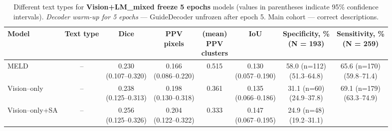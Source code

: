 \documentclass[FCD_GNN.tex]{subfiles}
\begin{document}
\begin{table}[H]
\centering
\tiny
\caption{Different text types for \textbf{Vision+LM\_mixed freeze 5 epochs} models (values in parentheses indicate 95\% confidence intervals). \emph{Decoder warm-up for 5 epochs} — GuideDecoder unfrozen after epoch 5. Main cohort — correct descriptions.}

\label{tab:main_cohort_mixed_5_epochs_correct}
\begin{tabular}{lccccccc}
\textbf{Model} &
\textbf{Text type} &
\textbf{Dice} &
\makecell{\textbf{PPV}\\\textbf{pixels}} &
\makecell{\textbf{(mean)} \\\textbf{PPV} \\\textbf{clusters}} & 
\textbf{IoU} & 
\makecell{\textbf{Specificity, \%} \\ (N = 193)}&
\makecell{\textbf{Sensitivity, \%} \\ (N = 259)}\\
\hline
MELD & -- &
\makecell{\colorbox{orange!15}{0.230}\\(0.107--0.320)} &
\makecell{0.166\\(0.086--0.220)} &
\colorbox{green!15}{0.515} &
\makecell{\colorbox{orange!15}{0.130}\\(0.057--0.190)} &
\makecell{58.0 (n=112) \\ (51.3--64.8)}&
\makecell{65.6 (n=170) \\ (59.8--71.4)} \\
\hline
Vision--only & -- &
\makecell{\colorbox{cyan!15}{0.238}\\(0.125--0.313)} &
\makecell{0.198\\(0.130--0.318)} &
0.361 &
\makecell{\colorbox{cyan!15}{0.135}\\(0.066--0.186)} &
\makecell{31.1 (n=60) \\ (24.9--37.8)} &
\makecell{69.1 (n=179) \\ (63.3--74.9)} \\
\hline
Vision--only+SA & -- &
\makecell{\colorbox{green!15}{0.256} \\ (0.125--0.326)} &
\makecell{0.204\\ (0.122--0.322)} &
0.333 &
\makecell{\colorbox{green!15}{0.147}\\ (0.067--0.195)} &
\makecell{24.9 (n=48) \\ (19.2--31.1)} &

\end{tabular}
\end{table}
\end{document}
